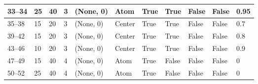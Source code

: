 \begin{longtable}{|C{0.9cm}|C{0.8cm}|C{0.8cm}|C{0.8cm}|C{3cm}|C{1.5cm}|C{1.5cm}|C{0.8cm}|C{0.8cm}|C{1cm}|C{1cm}|}
    33--34 &  25 &  40 &  3 & (None, 0) & Atom & True & True & False & False & 0.95 \\ \hline
    
    35--38 &  15 &  20 &  3 & (None, 0) & Center & True & True & False & False & 0.7 \\ \hline

    39--42 &  15 &  20 &  3 & (None, 0) & Center & True & True & False & False & 0.8 \\ \hline

    43--46 &  10 &  20 &  3 & (None, 0) & Center & True & True & False & False & 0.9 \\ \hline
    
    
    47--49 &  15 &  40 &  4 & (None, 0) & Atom & True & False & False & False & 0 \\ \hline

    50--52 &  25 &  40 &  4 & (None, 0) & Atom & True & False & False & False & 0 \\ \hline


\end{longtable}
